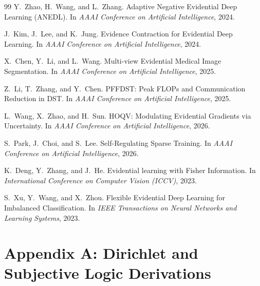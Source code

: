 \documentclass[letterpaper]{article} %
\begin{document}
\begin{thebibliography}{99}
Y.~Zhao, H.~Wang, and L.~Zhang.
\newblock Adaptive Negative Evidential Deep Learning (ANEDL).
\newblock In {\em AAAI Conference on Artificial Intelligence}, 2024.

J.~Kim, J.~Lee, and K.~Jung.
\newblock Evidence Contraction for Evidential Deep Learning.
\newblock In {\em AAAI Conference on Artificial Intelligence}, 2024.

X.~Chen, Y.~Li, and L.~Wang.
\newblock Multi-view Evidential Medical Image Segmentation.
\newblock In {\em AAAI Conference on Artificial Intelligence}, 2025.

Z.~Li, T.~Zhang, and Y.~Chen.
\newblock PFFDST: Peak FLOPs and Communication Reduction in DST.
\newblock In {\em AAAI Conference on Artificial Intelligence}, 2025.

L.~Wang, X.~Zhao, and H.~Sun.
\newblock HOQV: Modulating Evidential Gradients via Uncertainty.
\newblock In {\em AAAI Conference on Artificial Intelligence}, 2026.

S.~Park, J.~Choi, and S.~Lee.
\newblock Self-Regulating Sparse Training.
\newblock In {\em AAAI Conference on Artificial Intelligence}, 2026.

K.~Deng, Y.~Zhang, and J.~He.
\newblock Evidential learning with Fisher Information.
\newblock In {\em International Conference on Computer Vision (ICCV)}, 2023.

S.~Xu, Y.~Wang, and X.~Zhou.
\newblock Flexible Evidential Deep Learning for Imbalanced Classification.
\newblock In {\em IEEE Transactions on Neural Networks and Learning Systems}, 2023.

\end{thebibliography}

\appendix

\section{Appendix A: Dirichlet and Subjective Logic Derivations}
\end{document}
